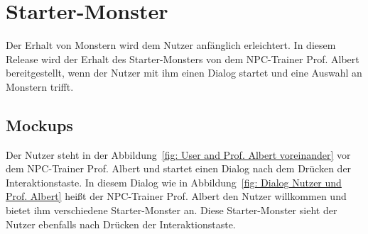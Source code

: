 \section{Starter-Monster}\label{sec:starter-monster}
Der Erhalt von Monstern wird dem Nutzer anfänglich erleichtert.
In diesem Release wird der Erhalt des Starter-Monsters von dem NPC-Trainer Prof. Albert bereitgestellt, wenn der Nutzer mit ihm einen Dialog startet und eine Auswahl an Monstern trifft.
\subsection{Mockups}\label{subsec:mockups-starter-monster}
Der Nutzer steht in der Abbildung~\ref{fig: User and Prof. Albert voreinander} vor dem NPC-Trainer Prof. Albert und startet einen Dialog nach dem Drücken der Interaktionstaste.
In diesem Dialog wie in Abbildung~\ref{fig: Dialog Nutzer und Prof. Albert} heißt der NPC-Trainer Prof. Albert den Nutzer willkommen und bietet ihm verschiedene Starter-Monster an.
Diese Starter-Monster sieht der Nutzer ebenfalls nach Drücken der Interaktionstaste.  
